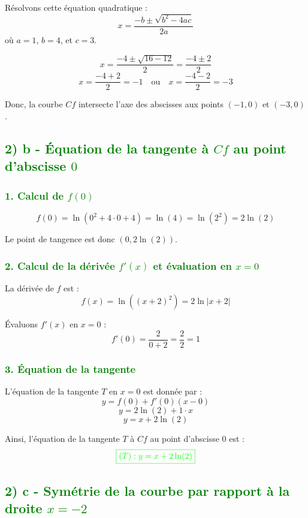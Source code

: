 \documentclass[12pt]{article}
\begin{document}
Résolvons cette équation quadratique :
\[
x = \frac{-b \pm \sqrt{b^2 - 4ac}}{2a}
\]
où \( a = 1 \), \( b = 4 \), et \( c = 3 \).

\[
x = \frac{-4 \pm \sqrt{16 - 12}}{2} = \frac{-4 \pm 2}{2}
\]
\[
x = \frac{-4 + 2}{2} = -1 \quad \text{ou} \quad x = \frac{-4 - 2}{2} = -3
\]

Donc, la courbe \( Cf \) intersecte l'axe des abscisses aux points \((-1, 0)\) et \((-3, 0)\).

\subsection*{\textcolor{green}{2) b - Équation de la tangente à \( Cf \) au point d'abscisse \( 0 \)}}

\subsubsection*{\textcolor{green}{1. Calcul de \( f(0) \)}}
\[
f(0) = \ln(0^2 + 4 \cdot 0 + 4) = \ln(4) = \ln(2^2) = 2 \ln(2)
\]

Le point de tangence est donc \((0, 2 \ln(2))\).

\subsubsection*{\textcolor{green}{2. Calcul de la dérivée \( f'(x) \) et évaluation en \( x = 0 \)}}
La dérivée de \( f \) est :
\[
f(x) = \ln((x + 2)^2) = 2 \ln|x + 2|
\]

Évaluons \( f'(x) \) en \( x = 0 \) :
\[
f'(0) = \frac{2}{0 + 2} = \frac{2}{2} = 1
\]

\subsubsection*{\textcolor{green}{3. Équation de la tangente}}
L'équation de la tangente \( T \) en \( x = 0 \) est donnée par :
\[
y = f(0) + f'(0)(x - 0)
\]
\[
y = 2 \ln(2) + 1 \cdot x
\]
\[
y = x + 2 \ln(2)
\]

Ainsi, l'équation de la tangente \( T \) à \( Cf \) au point d'abscisse \( 0 \) est :
\[\textcolor{green}{\boxed{
(T):y = x + 2 \ln(2)
}}\]

\subsection*{\textcolor{green}{2) c - Symétrie de la courbe par rapport à la droite \( x = -2 \)}}
\end{document}

